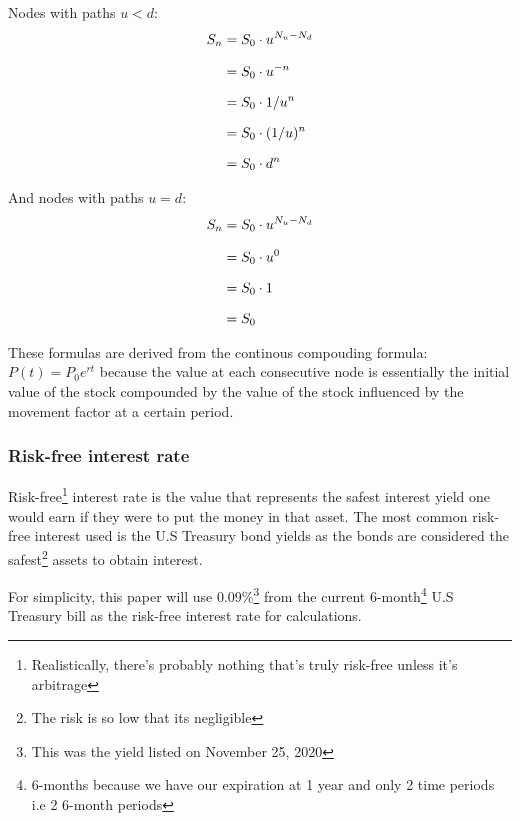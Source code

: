 \documentclass[12pt, letterpaper]{article}
\begin{document}
Nodes with paths ${u < d}$:
\begin{equation*}
  \setlength{\jot}{10pt}
  \begin{split}
    {S}_n
    & = {S}_0 \cdot {u}^{N_u-N_d} \\
    & = {S}_0 \cdot {u^{-n}} \\
    & = {S}_0 \cdot {1/u^n} \\
    & = {S}_0 \cdot ({1/u})^n \\
    & = {S}_0 \cdot {d^n}
  \end{split}
\end{equation*}

And nodes with paths ${u = d}$:
\begin{equation*}
  \setlength{\jot}{10pt}
  \begin{split}
    {S}_n
    & = {S}_0 \cdot {u}^{N_u-N_d} \\
    & = {S}_0 \cdot {u^0} \\
    & = {S}_0 \cdot 1 \\
    & = {S}_0
  \end{split}
\end{equation*}

These formulas are derived from the continous compouding formula\cite{continouscompoundingformulawikipedia}\cite{exponentcharacterizationswikipedia}:
${P(t)} = {P}_{0}e^{rt}$
because the value at each consecutive node is essentially the initial value of the stock compounded by the value of the stock influenced by the movement factor at a certain period.


\subsubsection*{Risk-free interest rate}
Risk-free\footnote{Realistically, there's probably nothing that's truly risk-free unless it's arbitrage} interest rate is the value that represents the safest interest yield one would earn if they were to put the money in that asset.
The most common risk-free interest used is the U.S Treasury bond yields as the bonds are considered the safest\footnote{The risk is so low that its negligible} assets to obtain interest.

For simplicity, this paper will use 0.09\%\footnote{This was the yield listed on November 25, 2020} from the current 6-month\footnote{6-months because we have our expiration at 1 year and only 2 time periods i.e 2 6-month periods} U.S Treasury bill as the risk-free interest rate for calculations.
\end{document}
